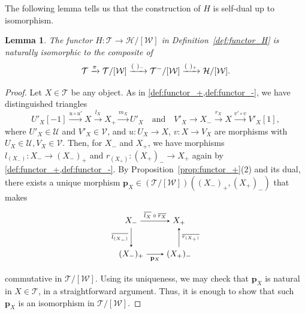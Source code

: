 \documentclass[a4paper,reqno,10pt]{amsart}
\DeclareRobustCommand{\darkblueedit}[1]{#1}
\newtheorem{lemma}[lemma]{Lemma}
\theoremstyle{definition}
\theoremstyle{definition}
\theoremstyle{definition}
\theoremstyle{definition}
\theoremstyle{plain}
\newcommand{\CH}{\mathcal{H}}
\newcommand{\CT}{\mathcal{T}}
\newcommand{\CU}{\mathcal{U}}
\newcommand{\CV}{\mathcal{V}}
\newcommand{\CW}{\mathcal{W}}
\begin{document}
The following lemma tells us that the construction of $H$ is self-dual up to isomorphism.
\begin{lemma}\label{lem:self-dual_H}
\darkblueedit{The functor} $H\colon\CT\to\CH/[\CW]$ in Definition~\ref{def:functor_H} is naturally isomorphic to the composite of
\[
\CT\xrightarrow{\textcolor{blue}{\pi}}\CT/[\CW]\xrightarrow{(\ )_-}\CT^-/[\CW]\xrightarrow{(\ )_+}\CH/[\CW].
\]
\end{lemma}
\begin{proof}
Let $X\in\CT$ be any object. 
As in \cref{def:functor_+,def:functor_-}, we have distinguished triangles
\[ U'_X[-1]\xrightarrow{u\circ u'}X\xrightarrow{l_X} X_+\xrightarrow{m_X}U'_X
\quad\text{and}\quad V'_X\to X_-\xrightarrow{r_X}X\xrightarrow{v'\circ v}V'_X[1], \]
where $U'_X\in\CU$ and $V'_X\in\CV$, and $u\colon U_X\to X$, $v\colon X\to V_X$ are morphisms with $U_X\in\CU, V_X\in\CV$. 
Then, for $X_-$ and $X_+$, we have morphisms $l_{(X_-)}\colon X_-\to (X_-)_+$ and $r_{(X_+)}\colon (X_+)_-\to X_+$ again by \cref{def:functor_+,def:functor_-}. 
\color{blue}
By Proposition~\ref{prop:functor_+}{\rm (2)} and its dual, there exists a unique morphism
\normalcolor
$\mathbf{p}_X\in(\CT/[\CW])((X_-)_+,(X_+)_-)$ that makes
\[
\begin{tikzpicture}[>=stealth]
\node (1) at (-1,0.7) {$X_-$};
\node (2) at (1,0.7) {$X_+$};
\node (3) at (-1,-0.7) {$(X_-)_+$};
\node (4) at (1,-0.7) {$(X_+)_-$};
\draw[->] (1) -- node[above,font=\scriptsize] {$\overline{l_X}\circ\overline{r_X}$} (2);
\draw[->] (1) -- node[left,font=\scriptsize] {$\overline{l_{(X_-)}}$} (3);
\draw[->] (4) -- node[right,font=\scriptsize] {$\overline{r_{(X_+)}}$} (2);
\draw[->] (3) -- node[below,font=\scriptsize] {$\mathbf{p}_X$} (4);
\end{tikzpicture}
\]
commutative in $\CT/[\CW]$. Using its uniqueness, we may check that $\mathbf{p}_X$ is natural in $X\in\CT$, in a straightforward argument. Thus, it is enough to show that such $\mathbf{p}_X$ is an isomorphism in $\CT/[\CW]$.


\end{proof}
\end{document}
